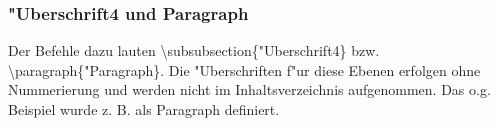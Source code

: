 \subsubsection{"Uberschrift4 und Paragraph}
\label{sec:uberschrift4}

Der Befehle dazu lauten {\textbackslash subsubsection\{"Uberschrift4\}} bzw. {\textbackslash paragraph\{"Paragraph\}}. Die "Uberschriften f"ur diese Ebenen erfolgen ohne Nummerierung und werden nicht im Inhaltsverzeichnis aufgenommen. Das o.g. Beispiel wurde z. B. als Paragraph definiert.





